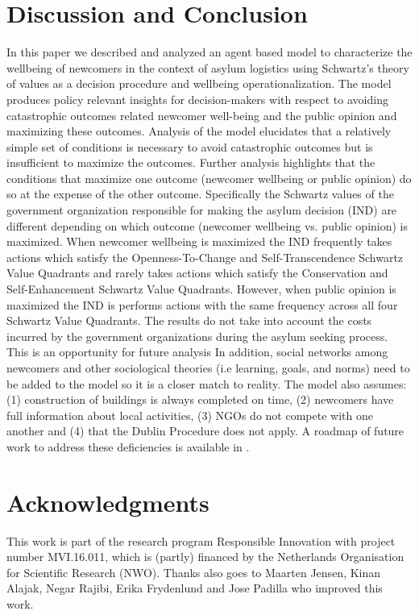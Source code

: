\documentclass{scspaperproc}
\theoremstyle{scsthe}
\begin{document}
\section{Discussion and Conclusion}
\label{sec:discussion}
In this paper we described and analyzed an agent based model to characterize the wellbeing of newcomers in the context of asylum logistics using Schwartz's theory of values as a decision procedure and wellbeing operationalization. The model produces policy relevant insights for decision-makers with respect to avoiding catastrophic outcomes related newcomer well-being and the public opinion and maximizing these outcomes. Analysis of the model elucidates that a relatively simple set of conditions is necessary to avoid catastrophic outcomes but is insufficient to maximize the outcomes. Further analysis highlights that the conditions that maximize one outcome (newcomer wellbeing or public opinion) do so at the expense of the other outcome. Specifically the Schwartz values of the government organization responsible for making the asylum decision (IND) are different depending on which outcome (newcomer wellbeing vs. public opinion) is maximized. When newcomer wellbeing is maximized the IND frequently takes actions which satisfy the Openness-To-Change and Self-Transcendence Schwartz Value Quadrants and rarely takes actions which satisfy the Conservation and Self-Enhancement Schwartz Value Quadrants. However, when public opinion is maximized the IND is performs actions with the same frequency across all four Schwartz Value Quadrants. The results do not take into account the costs incurred by the government organizations during the asylum seeking process. This is an opportunity for future analysis In addition, social networks among newcomers and other sociological theories (i.e learning, goals, and norms) need to be added to the model so it is a closer match to reality. The model also assumes: (1) construction of buildings is always completed on time, (2) newcomers have full information about local activities, (3) NGOs do not compete with one another and (4) that the Dublin Procedure does not apply. A roadmap of future work to address these deficiencies is available in \cite{phil.masters.thesis}. 
\section*{Acknowledgments}
This work is part of the research program Responsible Innovation with project number MVI.16.011, which is (partly) financed by the Netherlands Organisation for Scientific Research (NWO). Thanks also goes to Maarten Jensen, Kinan Alajak, Negar Rajibi, Erika Frydenlund and Jose Padilla who improved this work.


\end{document}
